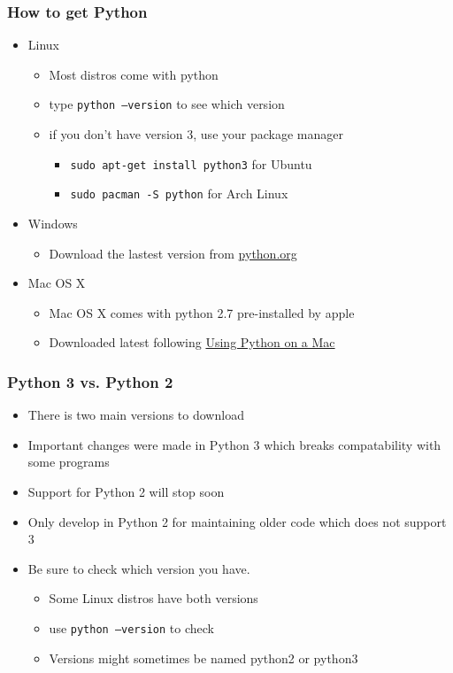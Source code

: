 \documentclass{beamer}
\begin{document}
\begin{frame}
  \frametitle{How to get Python}
  \begin{itemize}
    \item Linux
      \begin{itemize}
        \item Most distros come with python
        \item type \texttt{python --version} to see which version
        \item if you don't have version 3, use your package manager
          \begin{itemize}
            \item \texttt{sudo apt-get install python3} for Ubuntu
            \item \texttt{sudo pacman -S python} for Arch Linux
          \end{itemize}
      \end{itemize}
    \item Windows
      \begin{itemize}
        \item Download the lastest version from \href{http://python.org}{python.org}
      \end{itemize}
    \item Mac OS X
      \begin{itemize}
        \item Mac OS X comes with python 2.7 pre-installed by apple
        \item Downloaded latest following \href{http://docs.python.org/3.4/using/mac.html}{Using Python on a Mac}
      \end{itemize}
  \end{itemize}
\end{frame}
\begin{frame}
  \frametitle{Python 3 vs. Python 2}
  \begin{itemize}
    \item There is two main versions to download
    \item Important changes were made in Python 3 which breaks compatability with some programs
    \item Support for Python 2 will stop soon
    \item Only develop in Python 2 for maintaining older code which does not support 3
    \item Be sure to check which version you have.
      \begin{itemize}
        \item Some Linux distros have both versions
        \item use \texttt{python --version} to check
        \item Versions might sometimes be named python2 or python3
      \end{itemize}
  \end{itemize}
\end{frame}
\end{document}
